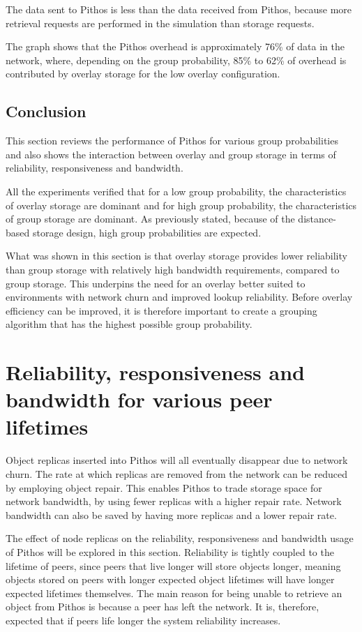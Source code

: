 The data sent to Pithos is less than the data received from Pithos, because more retrieval requests are performed in the simulation than storage requests.

The graph shows that the Pithos overhead is approximately 76\% of data in the network, where, depending on the group probability, 85\% to 62\% of overhead is contributed by overlay storage for the low overlay configuration.

\subsection{Conclusion}

This section reviews the performance of Pithos for various group probabilities and also shows the interaction between overlay and group storage in terms of reliability, responsiveness and bandwidth.

All the experiments verified that for a low group probability, the characteristics of overlay storage are dominant and for high group probability, the characteristics of group storage are dominant. As previously stated, because of the distance-based storage design, high group probabilities are expected.

What was shown in this section is that overlay storage provides lower reliability than group storage with relatively high bandwidth requirements, compared to group storage. This underpins the need for an overlay better suited to environments with network churn and improved lookup reliability. Before overlay efficiency can be improved, it is therefore important to create a grouping algorithm that has the highest possible group probability.

\section{Reliability, responsiveness and bandwidth for various peer lifetimes}
\label{repair_results}

Object replicas inserted into Pithos will all eventually disappear due to network churn. The rate at which replicas are removed from the network can be reduced by employing object repair. This enables Pithos to trade storage space for network bandwidth, by using fewer replicas with a higher repair rate. Network bandwidth can also be saved by having more replicas and a lower repair rate.

The effect of node replicas on the reliability, responsiveness and bandwidth usage of Pithos will be explored in this section. Reliability is tightly coupled to the lifetime of peers, since peers that live longer will store objects longer, meaning objects stored on peers with longer expected object lifetimes will have longer expected lifetimes themselves. The main reason for being unable to retrieve an object from Pithos is because a peer has left the network. It is, therefore, expected that if peers life longer the system reliability increases.

